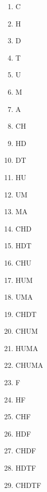 \begin{multicols}{4}
\begin{enumerate}

\item C             %
\item H           %
\item D           %
\item T          %
\item U         %
\item M             %
\item A             %

\item CH         %
\item HD         %
\item DT    %
\item HU               %
\item UM              %
\item MA  %

\item CHD            %
\item HDT            %
\item CHU                  %
\item HUM               %
\item UMA     %

\item CHDT      %
\item CHUM                %
\item HUMA   %

\item CHUMA %

\item F                         %
\item HF             %
\item CHF        %
\item HDF         %
\item CHDF         %
\item HDTF          %
\item CHDTF        %

\end{enumerate}
\end{multicols}

